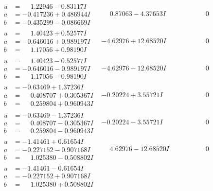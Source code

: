 \documentclass[1p]{elsarticle_modified}
\theoremstyle{definition}
\begin{document}
$$\begin{array}{c|c|c}
\begin{aligned}
u &= \phantom{-}1.22946 - 0.83117 I \\
a &= -0.417236 + 0.486944 I \\
b &= -0.435299 - 0.086669 I\end{aligned}
 & \phantom{-}0.87063 - 4.37653 I & \phantom{-0.000000 } 0 \\ \hline\begin{aligned}
u &= \phantom{-}1.40423 + 0.52577 I \\
a &= -0.646016 + 0.989197 I \\
b &= \phantom{-}1.17056 + 0.98190 I\end{aligned}
 & -4.62976 + 12.68520 I & \phantom{-0.000000 } 0 \\ \hline\begin{aligned}
u &= \phantom{-}1.40423 - 0.52577 I \\
a &= -0.646016 - 0.989197 I \\
b &= \phantom{-}1.17056 - 0.98190 I\end{aligned}
 & -4.62976 - 12.68520 I & \phantom{-0.000000 } 0 \\ \hline\begin{aligned}
u &= -0.63469 + 1.37236 I \\
a &= \phantom{-}0.408707 + 0.305367 I \\
b &= \phantom{-}0.259804 + 0.960943 I\end{aligned}
 & -0.20224 + 3.55721 I & \phantom{-0.000000 } 0 \\ \hline\begin{aligned}
u &= -0.63469 - 1.37236 I \\
a &= \phantom{-}0.408707 - 0.305367 I \\
b &= \phantom{-}0.259804 - 0.960943 I\end{aligned}
 & -0.20224 - 3.55721 I & \phantom{-0.000000 } 0 \\ \hline\begin{aligned}
u &= -1.41461 + 0.61654 I \\
a &= -0.227152 - 0.907168 I \\
b &= \phantom{-}1.025380 - 0.508802 I\end{aligned}
 & \phantom{-}4.62976 - 12.68520 I & \phantom{-0.000000 } 0 \\ \hline\begin{aligned}
u &= -1.41461 - 0.61654 I \\
a &= -0.227152 + 0.907168 I \\
b &= \phantom{-}1.025380 + 0.508802 I\end{aligned}

\end{array}$$
\end{document}
